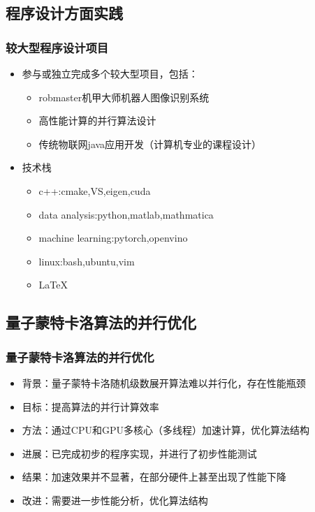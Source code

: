 \documentclass[12pt,aspectratio=169,UTF8]{beamer}
\begin{document}
\subsection{程序设计方面实践}
\begin{frame}
  \frametitle{较大型程序设计项目}
  \begin{itemize}
    \item 参与或独立完成多个较大型项目，包括：
    \begin{itemize}
      \item robmaster机甲大师机器人图像识别系统
      \item 高性能计算的并行算法设计
      \item 传统物联网java应用开发（计算机专业的课程设计）
    \end{itemize}
    \item 技术栈
    \begin{itemize}
      \item c++:cmake,VS,eigen,cuda
      \item data analysis:python,matlab,mathmatica
      \item machine learning:pytorch,openvino
      \item linux:bash,ubuntu,vim
      \item \LaTeX
    \end{itemize}
  \end{itemize}
\end{frame}

\subsection{量子蒙特卡洛算法的并行优化}
\begin{frame}
  \frametitle{量子蒙特卡洛算法的并行优化}
  \begin{itemize}
    \item 背景：量子蒙特卡洛随机级数展开算法难以并行化，存在性能瓶颈
    \item 目标：提高算法的并行计算效率
    \item 方法：通过CPU和GPU多核心（多线程）加速计算，优化算法结构
    \item 进展：已完成初步的程序实现，并进行了初步性能测试
    \item 结果：加速效果并不显著，在部分硬件上甚至出现了性能下降
    \item 改进：需要进一步性能分析，优化算法结构
  \end{itemize}
\end{frame}
\end{document}
